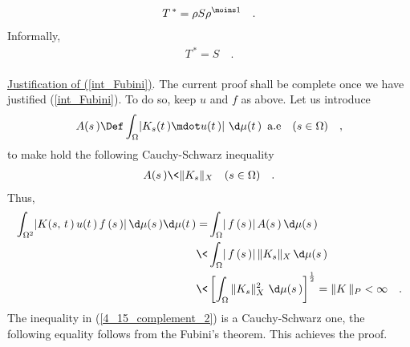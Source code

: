 \begin{align}
 T^{\,\ast}   =  \rho S \rho^{\moins 1} \quad .
\end{align}
Informally, 
\begin{align}
T^{\,\ast} = S\quad .
\end{align}
\\
\underline{Justification of (\ref{int_Fubini})}. The current proof shall be complete once we have justified (\ref{int_Fubini}). To do so, keep $u$ and $f$ as above. Let us introduce
\begin{align}
A(s\,)\Def \int_\Omega \lvert K_s(t\,) \mdot u (t\,)\rvert  \,\, \d\mu(t\,) \, \,\,\text{a.e}  \quad (s\in \Omega)\quad ,
\end{align}
to make hold the following Cauchy-Schwarz inequality
\begin{align}
A(s\,)\< \| K_s\|_X  \quad (s\in \Omega)\quad .
\end{align}
Thus,
\begin{align}
 \int_{\Omega^2} \lvert K(s,\,t\,) \, u(t\,)\,  f\,(s\,) \rvert \,\d\mu(s\,)\d\mu(t\,) 
 = &   \int_\Omega   \lvert \,f\,(s\,) \rvert \,A(s\,) \, \d\mu(s\,) \\
 \< &  \int_\Omega   \lvert \,f\,(s\,) \rvert  \, \| K_s\|_X\,\d\mu(s\,) \\
 \label{4_15_complement_2} \< & \left[ \int_\Omega \| K_s\|_X^2\,\,\d\mu(s\,) \right]^{\frac{1}{2}} 
 =      \| K\,\|_P < \infty \quad .
 \end{align}
The inequality in (\ref{4_15_complement_2}) is a Cauchy-Schwarz one, the following equality follows from the Fubini's theorem. This achieves the proof.\QED








